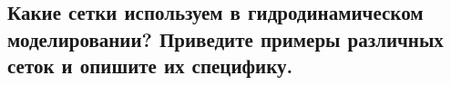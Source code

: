 

\subsection{Какие сетки используем в гидродинамическом моделировании? Приведите примеры различных сеток и опишите их специфику.}


